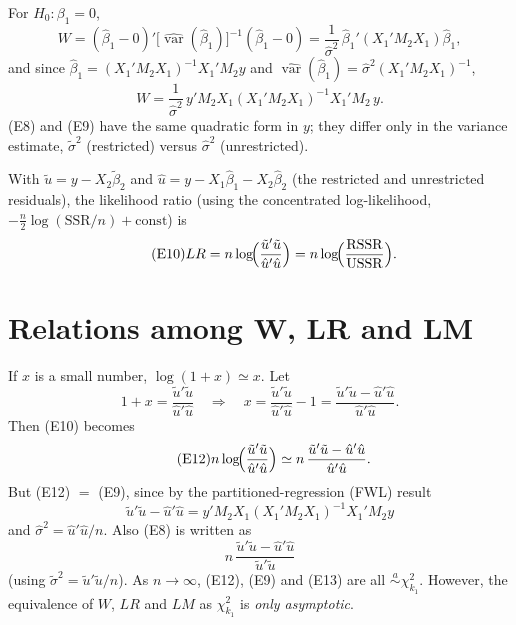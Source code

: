 \documentclass[11pt]{article}
\begin{document}
For $H_{0}\colon\beta_{1}=0$,
\[ W=(\hat\beta_{1}-0)'\bigl[\widehat{\operatorname{var}}(\hat\beta_{1})\bigr]^{-1}(\hat\beta_{1}-0)
   =\frac1{\hat\sigma^{2}}\,\hat\beta_{1}'(X_{1}'M_{2}X_{1})\hat\beta_{1}, \]
and since $\hat\beta_{1}=(X_{1}'M_{2}X_{1})^{-1}X_{1}'M_{2}y$ and
$\widehat{\operatorname{var}}(\hat\beta_{1})=\hat\sigma^{2}(X_{1}'M_{2}X_{1})^{-1}$,
\begin{equation}\tag{E9}
 W=\frac1{\hat\sigma^{2}}\,y'M_{2}X_{1}(X_{1}'M_{2}X_{1})^{-1}X_{1}'M_{2}\,y .
\end{equation}
(E8) and (E9) have the same quadratic form in $y$; they differ only in the variance estimate,
$\tilde\sigma^{2}$ (restricted) versus $\hat\sigma^{2}$ (unrestricted).

With $\tilde u=y-X_{2}\tilde\beta_{2}$ and $\hat u=y-X_{1}\hat\beta_{1}-X_{2}\hat\beta_{2}$ (the restricted and
unrestricted residuals), the likelihood ratio (using the concentrated log-likelihood,
$-\frac n2\log(\mathrm{SSR}/n)+\text{const}$) is
\begin{equation}\tag{E10}
 LR=n\log\!\Bigl(\frac{\tilde u'\tilde u}{\hat u'\hat u}\Bigr)=n\log\!\Bigl(\frac{\mathrm{RSSR}}{\mathrm{USSR}}\Bigr).
\end{equation}

\section{Relations among W, LR and LM}

If $x$ is a small number, $\log(1+x)\simeq x$. Let
\begin{equation}\tag{E11}
 1+x=\frac{\tilde u'\tilde u}{\hat u'\hat u}\quad\Longrightarrow\quad
 x=\frac{\tilde u'\tilde u}{\hat u'\hat u}-1=\frac{\tilde u'\tilde u-\hat u'\hat u}{\hat u'\hat u}.
\end{equation}
Then (E10) becomes
\begin{equation}\tag{E12}
 n\log\!\Bigl(\frac{\tilde u'\tilde u}{\hat u'\hat u}\Bigr)\simeq n\,\frac{\tilde u'\tilde u-\hat u'\hat u}{\hat u'\hat u}.
\end{equation}
But (E12) $=$ (E9), since by the partitioned-regression (FWL) result
\[ \tilde u'\tilde u-\hat u'\hat u=y'M_{2}X_{1}(X_{1}'M_{2}X_{1})^{-1}X_{1}'M_{2}y \]
and $\hat\sigma^{2}=\hat u'\hat u/n$. Also (E8) is written as
\begin{equation}\tag{E13}
 n\,\frac{\tilde u'\tilde u-\hat u'\hat u}{\tilde u'\tilde u}
\end{equation}
(using $\tilde\sigma^{2}=\tilde u'\tilde u/n$). As $n\to\infty$, (E12), (E9) and (E13) are all
$\overset{a}{\sim}\chi^{2}_{k_{1}}$. However, the equivalence of $W$, $LR$ and $LM$ as $\chi^{2}_{k_{1}}$ is
\emph{only asymptotic}.
\end{document}
